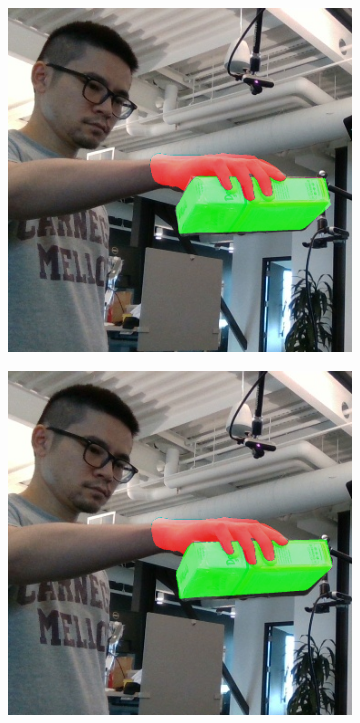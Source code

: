 \begin{figure}[h!]
\begin{subfigure}[b]{0.16\linewidth}
  \end{subfigure}
  \begin{subfigure}[b]{0.16\linewidth}
    \includegraphics[width=0.98\linewidth]{figs/5319_1}
  \end{subfigure}
  \begin{subfigure}[b]{0.16\linewidth}
    \includegraphics[width=0.98\linewidth]{figs/5319_2}

\end{subfigure}
\end{figure}

